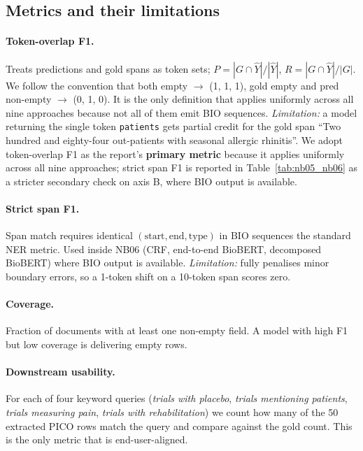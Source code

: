 \documentclass[11pt]{article}
\begin{document}
\subsection{Metrics and their limitations}
\label{sec:metrics}

\paragraph{Token-overlap F1.} Treats predictions and gold spans as token
sets; $P\!=\!|G \cap \hat{Y}| / |\hat{Y}|$, $R\!=\!|G \cap \hat{Y}| /
|G|$. We follow the convention that both empty $\rightarrow$ (1, 1, 1),
gold empty and pred non-empty $\rightarrow$ (0, 1, 0). It is the only
definition that applies uniformly across all nine approaches because
not all of them emit BIO sequences. \textit{Limitation:} a model
returning the single token \texttt{patients} gets partial credit for
the gold span ``Two hundred and eighty-four out-patients with seasonal
allergic rhinitis''. We adopt token-overlap F1 as the report's
\textbf{primary metric} because it applies uniformly across all nine
approaches; strict span F1 is reported in Table~\ref{tab:nb05_nb06} as
a stricter secondary check on axis B, where BIO output is available.

\paragraph{Strict span F1.} Span match requires identical $(\text{start},
\text{end}, \text{type})$ in BIO sequences the standard NER metric.
Used inside NB06 (CRF, end-to-end BioBERT, decomposed BioBERT) where
BIO output is available. \textit{Limitation:} fully penalises minor
boundary errors, so a 1-token shift on a 10-token span scores zero.

\paragraph{Coverage.} Fraction of documents with at least one non-empty
field. A model with high F1 but low coverage is delivering empty rows.

\paragraph{Downstream usability.} For each of four keyword queries
(\textit{trials with placebo}, \textit{trials mentioning patients},
\textit{trials measuring pain}, \textit{trials with rehabilitation}) we
count how many of the 50 extracted PICO rows match the query and
compare against the gold count. This is the only metric that is
end-user-aligned.
\end{document}
